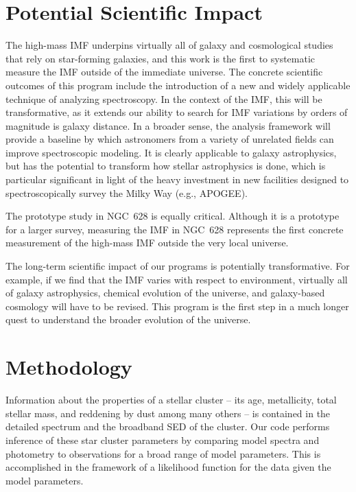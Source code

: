 \documentclass[11pt,preprint]{aastex}
\begin{document}
\section{Potential Scientific Impact}

The high-mass IMF underpins virtually all of galaxy and cosmological studies that rely on star-forming galaxies, and this work is the first to systematic measure the IMF outside of the immediate universe.  The concrete scientific outcomes of this program include the introduction of a new and widely applicable technique of analyzing spectroscopy.  In the context of the IMF, this will be transformative, as it extends our ability to search for IMF variations by orders of magnitude is galaxy distance.  In a broader sense, the analysis framework will provide a baseline by which astronomers from a variety of unrelated fields can improve spectroscopic modeling.  It is clearly applicable to galaxy astrophysics, but has the potential to transform how stellar astrophysics is done, which is particular significant in light of the heavy investment in new facilities designed to spectroscopically survey the Milky Way (e.g., APOGEE).

The prototype study in NGC~628 is equally critical.  Although it is a prototype for a larger survey, measuring the IMF in NGC~628 represents the first concrete measurement of the high-mass IMF outside the very local universe.  

The long-term scientific impact of our programs is potentially transformative.  For example, if we find that the IMF varies with respect to environment, virtually all of galaxy astrophysics, chemical evolution of the universe, and galaxy-based cosmology will have to be revised.  This program is the first step in a much longer quest to understand the broader evolution of the universe.

\section{Methodology}

Information about the properties of a stellar cluster -- its age, metallicity, total stellar mass, and reddening by dust among many others -- is contained in the detailed spectrum and the broadband SED of the cluster. 
Our code performs inference of these star cluster parameters by comparing model spectra and photometry to observations for a broad range of model parameters.  
This is accomplished in the framework of a likelihood function for the data given the model parameters.  
\end{document}
